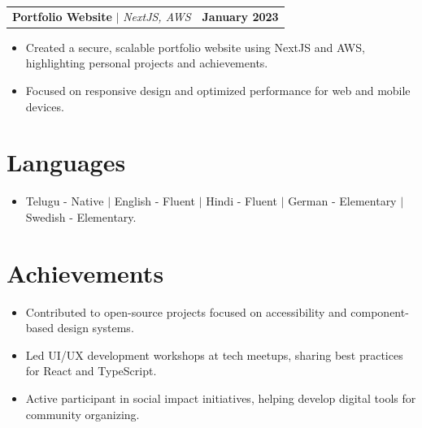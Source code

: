 \documentclass[letterpaper,11pt]{article}
\makeatletter
\newcommand{\resumeProjectHeading}[2]{
    \item
    \begin{tabular*}{1.001\textwidth}{l@{\extracolsep{\fill}}r}
      \small#1 & \textbf{\small #2}\\
    \end{tabular*}\vspace{-7pt}
}
\makeatother
\begin{document}
\resumeProjectHeading
{\textbf{Portfolio Website} $|$ \emph{NextJS, AWS}}{January 2023}
\begin{itemize}
    \item Created a secure, scalable portfolio website using NextJS and AWS, highlighting personal projects and achievements.
    \item Focused on responsive design and optimized performance for web and mobile devices.
\end{itemize}

\section*{Languages}
\begin{itemize}
  \item Telugu - Native $|$ English - Fluent $|$ Hindi - Fluent $|$ German - Elementary $|$ Swedish - Elementary.
\end{itemize}

\section{Achievements}
\begin{itemize}
    \item Contributed to open-source projects focused on accessibility and component-based design systems.
    \item Led UI/UX development workshops at tech meetups, sharing best practices for React and TypeScript.
    \item Active participant in social impact initiatives, helping develop digital tools for community organizing.
\end{itemize}
\end{document}
